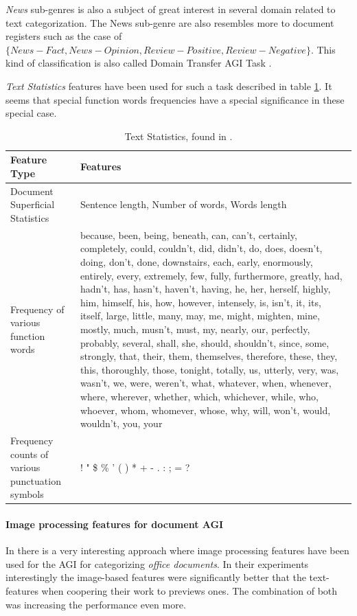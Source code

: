 \textit{News} sub-genres is also a subject of great interest in several domain related to text categorization. The News sub-genre are also resembles more to document registers such as the case of $\{News-Fact, News-Opinion, Review-Positive, Review-Negative\}$. This kind of classification is also called {Domain Transfer} AGI Task \parencite{finn2006learning}. 

\textit{Text Statistics} features have been used for such a task described in table \ref{chap:relevant_work:tbl:domain_trans_text_statistics}. It seems that special function words frequencies have a special significance in these special case. 

\begin{table}[t]
	\center
	\caption {Text Statistics, found in \parencite{finn2006learning}.}\label{chap:relevant_work:tbl:domain_trans_text_statistics}
	\begin{tabular}{p{3cm}|p{11cm}}
		\hline
		Feature Type & Features\\
		\hline
		 Document Superficial Statistics & Sentence length, Number of words, Words length \\
         Frequency of various function words & because, been, being, beneath, can, can’t, certainly, completely, could, couldn’t, did, didn’t, do, does, doesn’t, doing, don’t, done, downstairs, each, early, enormously, entirely, every, extremely, few, fully, furthermore, greatly, had, hadn’t, has, hasn’t, haven’t, having, he, her, herself, highly, him, himself, his, how, however, intensely, is, isn’t, it, its, itself, large, little, many, may, me, might, mighten, mine, mostly, much, musn’t, must, my, nearly, our, perfectly, probably, several, shall, she, should, shouldn’t, since, some, strongly, that, their, them, themselves, therefore, these, they, this, thoroughly, those, tonight, totally, us, utterly, very, was, wasn’t, we, were, weren’t, what, whatever, when, whenever, where, wherever, whether, which, whichever, while, who, whoever, whom, whomever, whose, why, will, won’t, would, wouldn’t, you, your \\
         Frequency counts of various punctuation symbols  & ! " \$ \% ' ( ) * + - . : ; = ? \\
  		\hline
	\end{tabular}
\end{table}

\paragraph{Image processing features for document AGI} In \parencite{chen2012genre} there is a very interesting approach where image processing features have been used for the AGI for categorizing \textit{office documents}. In their experiments interestingly the image-based features were significantly better that the text-features when coopering their work to previews ones. The combination of both was increasing the performance even more.

